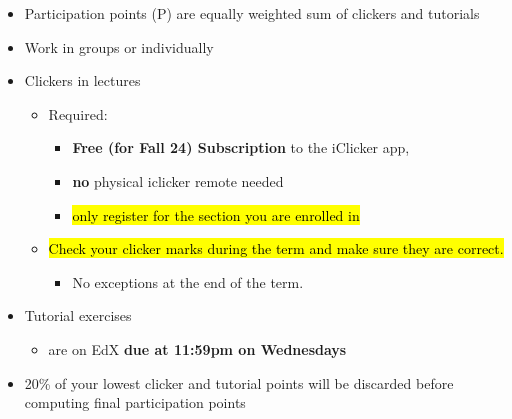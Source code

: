 \begin{frame}[fragile]
\begin{itemize}
        \item Participation points (P) are equally weighted sum of clickers and tutorials
  \item Work in groups or individually   
    \item Clickers in lectures 
     \begin{itemize}
    \item Required: 
\begin{itemize}
    \item \textbf{Free (for Fall 24) Subscription} to the iClicker app, 
    \item \textbf{no} physical iclicker remote needed
        \item \hl{only register for the section you are enrolled in}
    \end{itemize}
     \item \hl{Check your clicker marks during the term and make sure they are correct.}
  \begin{itemize}
 \item No exceptions at the end of the term. 
\end{itemize}
\end{itemize}

 \item Tutorial exercises
 \begin{itemize}
      
        \item are on EdX \textbf{due at 11:59pm on Wednesdays}
        	
    \end{itemize}
   
     

\item 20\% of your lowest clicker and tutorial points will be discarded before computing final participation points


\end{itemize}
\end{frame}
